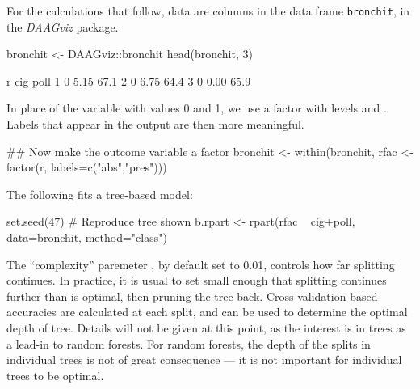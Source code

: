 For the calculations that follow, data are columns in the data frame
\texttt{bronchit}, in the {\em DAAGviz} package.
\begin{Schunk}
\begin{Sinput}
bronchit <- DAAGviz::bronchit
head(bronchit, 3)
\end{Sinput}
\begin{Soutput}
  r  cig poll
1 0 5.15 67.1
2 0 6.75 64.4
3 0 0.00 65.9
\end{Soutput}
\end{Schunk}
In place of the variable  with values 0 and 1, we use a
factor with levels  and . Labels that appear
in the output are then more meaningful.
\begin{Schunk}
\begin{Sinput}
## Now make the outcome variable a factor
bronchit <-
  within(bronchit,
         rfac <- factor(r, labels=c("abs","pres")))
\end{Sinput}
\end{Schunk}

The following fits a tree-based model:
\begin{Schunk}
\begin{Sinput}
set.seed(47)   # Reproduce tree shown
b.rpart <- rpart(rfac ~ cig+poll, data=bronchit,
                 method="class")
\end{Sinput}
\end{Schunk}

The ``complexity'' paremeter , by default set to 0.01,
controls how far splitting continues.  In practice, it is usual to
set  small enough that splitting continues further than
is optimal, then pruning the tree back. Cross-validation based
accuracies are calculated at each split, and can be used to determine
the optimal depth of tree.  Details will not be given at this point,
as the interest is in trees as a lead-in to random forests.  For
random forests, the depth of the splits in individual trees is not
of great consequence --- it is not important for individual trees
to be optimal.

